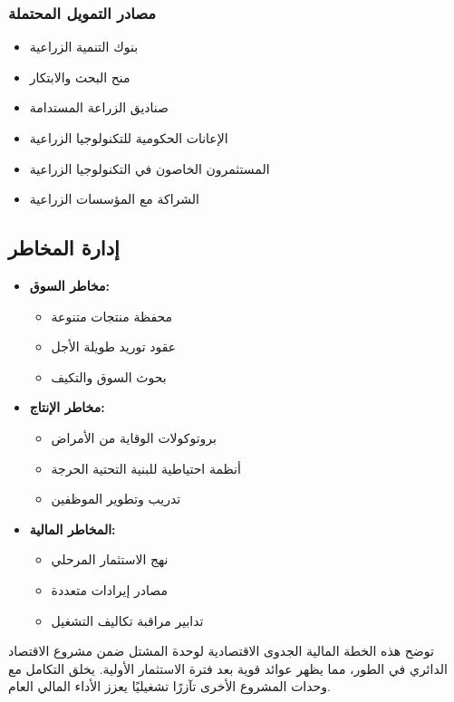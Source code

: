\subsubsection{مصادر التمويل المحتملة}
\begin{itemize}
    \item بنوك التنمية الزراعية
    \item منح البحث والابتكار
    \item صناديق الزراعة المستدامة
    \item الإعانات الحكومية للتكنولوجيا الزراعية
    \item المستثمرون الخاصون في التكنولوجيا الزراعية
    \item الشراكة مع المؤسسات الزراعية
\end{itemize}

\subsection{إدارة المخاطر}
\begin{itemize}
    \item \textbf{مخاطر السوق:}
    \begin{itemize}
        \item محفظة منتجات متنوعة
        \item عقود توريد طويلة الأجل
        \item بحوث السوق والتكيف
    \end{itemize}
    
    \item \textbf{مخاطر الإنتاج:}
    \begin{itemize}
        \item بروتوكولات الوقاية من الأمراض
        \item أنظمة احتياطية للبنية التحتية الحرجة
        \item تدريب وتطوير الموظفين
    \end{itemize}
    
    \item \textbf{المخاطر المالية:}
    \begin{itemize}
        \item نهج الاستثمار المرحلي
        \item مصادر إيرادات متعددة
        \item تدابير مراقبة تكاليف التشغيل
    \end{itemize}
\end{itemize}

توضح هذه الخطة المالية الجدوى الاقتصادية لوحدة المشتل ضمن مشروع الاقتصاد الدائري في الطور، مما يظهر عوائد قوية بعد فترة الاستثمار الأولية. يخلق التكامل مع وحدات المشروع الأخرى تآزرًا تشغيليًا يعزز الأداء المالي العام. 